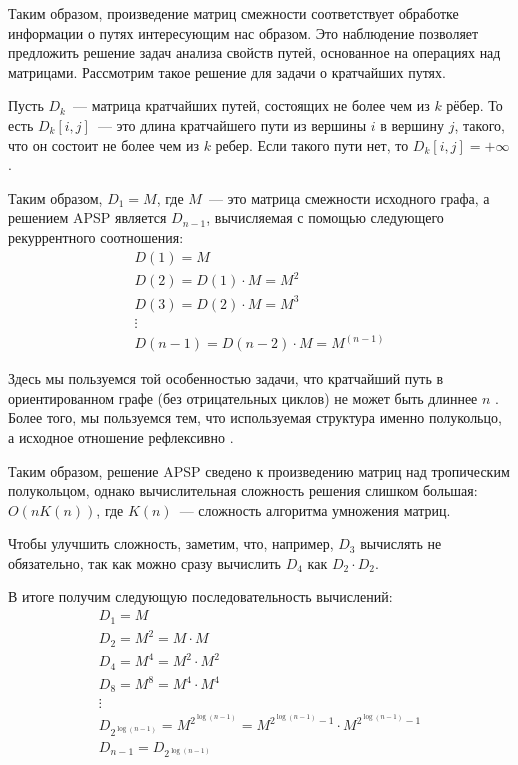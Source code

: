  Таким образом, произведение матриц смежности соответствует обработке информации о путях интересующим нас образом.
 Это наблюдение позволяет предложить решение задач анализа свойств путей, основанное на операциях над матрицами.
 Рассмотрим такое решение для задачи о кратчайших путях.

 Пусть $D_k$~--- матрица кратчайших путей, состоящих не более чем из $k$ рёбер.
 То есть $D_k[i, j]$~--- это длина кратчайшего пути из вершины $i$ в вершину $j$, такого, что он состоит не более чем из $k$ ребер.
 Если такого пути нет, то $D_k[i, j] = +\infty$.

 Таким образом, $D_1 = M$, где $M$~--- это матрица смежности исходного графа, а решением APSP является $D_{n-1}$, вычисляемая с помощью следующего рекуррентного соотношения:
 \begin{gather*}
     D(1) = M \\
     D(2) = D(1) \cdot M = M^2 \\
     D(3) = D(2) \cdot M = M^3 \\
     \vdots \\
     D(n - 1) = D(n - 2) \cdot M = M^{(n - 1)}
 \end{gather*}

 Здесь мы пользуемся той особенностью задачи, что кратчайший путь в ориентированном графе (без отрицательных циклов) не может быть длиннее $n$%
 .
 Более того, мы пользуемся тем, что используемая структура именно полукольцо, а исходное отношение рефлексивно%
 .

 Таким образом, решение APSP сведено к произведению матриц над тропическим полукольцом, однако вычислительная сложность решения слишком большая: $O(n K(n))$, где $K(n)$~--- сложность алгоритма умножения матриц.

 Чтобы улучшить сложность, заметим, что, например, $D_3$ вычислять не обязательно, так как можно сразу вычислить $D_4$ как $D_2 \cdot D_2$.

 В итоге получим следующую последовательность вычислений:
 \begin{gather*}
     D_1 = M \\
     D_2 = M^2 = M \cdot M \\
     D_4 = M^4 = M^2 \cdot M^2 \\
     D_8 = M^8 = M^4 \cdot M^4 \\
     \vdots \\
     D_{2^{\log(n-1)}} = M^{2^{\log(n-1)}} = M^{2^{\log(n-1)} - 1} \cdot M^{2^{\log(n-1)} - 1} \\
     D_{n-1} = D_{2^{\log(n-1)}}
 \end{gather*}


